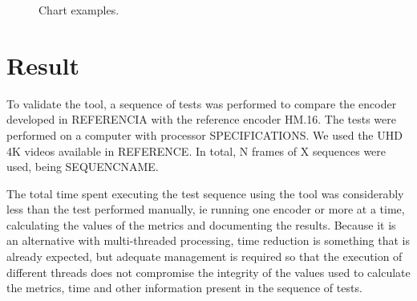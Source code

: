 \documentclass[journal]{IEEEtran}
\begin{document}
\FloatBarrier
\begin{figure}[!htb]
	\centering
	\caption{Chart examples.}
	\quad %
\end{figure}
\FloatBarrier

	


\section{Result}

To validate the tool, a sequence of tests was performed to compare the encoder developed in REFERENCIA with the reference encoder HM.16. The tests were performed on a computer with processor SPECIFICATIONS. We used the UHD 4K videos available in REFERENCE. In total, N frames of X sequences were used, being SEQUENCNAME.


The total time spent executing the test sequence using the tool was considerably less than the test performed manually, ie running one encoder or more at a time, calculating the values of the metrics and documenting the results. Because it is an alternative with multi-threaded processing, time reduction is something that is already expected, but adequate management is required so that the execution of different threads does not compromise the integrity of the values used to calculate the metrics, time and other information present in the sequence of tests.






\end{document}
